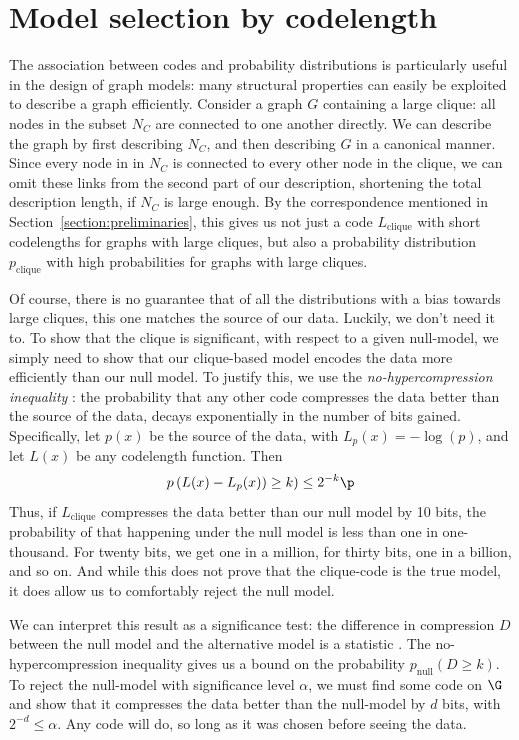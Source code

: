\section{Model selection by codelength}

\label{section:model-selection}

The association between codes and probability distributions is particularly useful in the design of graph models: many structural properties can easily be exploited to describe a graph efficiently. Consider a graph $G$ containing a large clique: all nodes in the subset $N_C$ are connected to one another directly. We can describe the graph by first describing $N_C$, and then describing $G$ in a canonical manner. Since every node in in $N_C$ is connected to every other node in the clique, we can omit these links from the second part of our description, shortening the total description length, if $N_C$ is large enough. By the correspondence mentioned in Section~\ref{section:preliminaries}, this gives us not just a code $L_\text{clique}$ with short codelengths for graphs with large cliques, but also a probability distribution $p_\text{clique}$ with high probabilities for graphs with large cliques. 

Of course, there is no guarantee that of all the distributions with a bias towards large cliques, this one matches the source of our data. Luckily, we don't need it to. To show that the clique is significant, with respect to a given null-model, we simply need to show that our clique-based model encodes the data more efficiently than our null model. To justify this, we use the \emph{no-hypercompression inequality} \cite[p103]{grunwald2007minimum}: the probability that any other code compresses the data better than the source of the data, decays exponentially in the number of bits gained. Specifically, let $p(x)$ be the source of the data, with $L_p(x) = -\log(p)$, and let $L(x)$ be any codelength function. Then
\[
p\left(L(x) - L_p(x)) \geq k\right) \leq 2^{-k} \p
\]
Thus, if $L_\text{clique}$ compresses the data better than our null model by 10 bits, the probability of that happening under the null model is less than one in one-thousand. For twenty bits, we get one in a million, for thirty bits, one in a billion, and so on. And while this does not prove that the clique-code is the true model, it does allow us to comfortably reject the null model. 

We can interpret this result as a significance test: the difference  in compression $D$ between the null model and the alternative model is a statistic \cite[Example~14.2]{grunwald2007minimum}. The no-hypercompression inequality gives us a bound on the probability $p_\text{null}(D \geq k)$. To reject the null-model with significance level $\alpha$, we must find some code on $\G$ and show that it compresses the data better than the null-model by $d$ bits, with $2^{-d} \leq \alpha$. Any code will do, so long as it was chosen before seeing the data.

